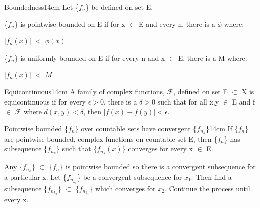     \begin{definition}{Boundedness}{14cm}
        Let \{$f_n$\} be defined on set E.

        \{$f_n$\} is pointwise bounded on E if for x $\in$ E and every n,
        there is a $\phi$ where:

        \hspace{0.5cm}
        $|f_n(x)|$ $<$ $\phi(x)$

        \{$f_n$\} is uniformly bounded on E if for every n and x $\in$ E,
        there is a M where:

        \hspace{0.5cm}
        $|f_n(x)|$ $<$ $M$
    \end{definition}

    \vspace{0.5cm}



    \begin{definition}{Equicontinuous}{14cm}
        A family of complex functions, $\mathscr{F}$, defined on set E $\subset$ X
        is equicontinuous if for every $\epsilon > 0$, there is a $\delta > 0$
        such that for all x,y $\in$ E and f $\in$ $\mathscr{F}$ where
        $d(x,y) < \delta$, then $|f(x) - f(y)| < \epsilon$.
    \end{definition}

    \vspace{0.5cm}



    \begin{wtheorem}{Pointwise bounded \{$f_n$\} over countable sets have
    convergent \{$f_{n_k}$\}}{14cm}
        If \{$f_n$\} are pointwise bounded, complex functions on countable set E,
        then \{$f_n$\} has subsequence \{$f_{n_k}$\} such that
        \{$f_{n_k}(x)$\} converges for every x $\in$ E.
    \end{wtheorem}

    \begin{intuition}
        Any \{$f_{n_k}$\} $\subset$ \{$f_n$\} is pointwise bounded
        so there is a convergent subsequence for a particular x.
        Let \{$f_{n_{k_1}}$\} be a convergent subsequence for $x_1$.
        Then find a subsequence \{$f_{n_{k_2}}$\} $\subset$ \{$f_{n_{k_1}}$\}
        which converges for $x_2$. Continue the process until every x.
    \end{intuition}

    \vspace{0.1cm}

